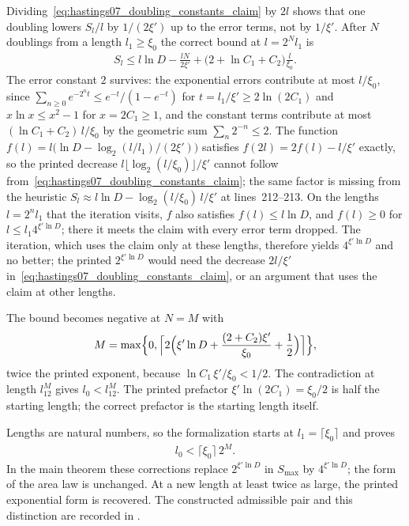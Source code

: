 \documentclass{article}
\begin{document}
Dividing~\eqref{eq:hastings07_doubling_constants_claim} by $2l$ shows that one
doubling lowers $S_l/l$ by
$1/(2\xi')$ up to the error terms, not by $1/\xi'$. After $N$ doublings
from a length $l_1\ge\xi_0$ the correct bound at $l=2^Nl_1$ is
\begin{align}
    S_l\le l\ln D-\frac{lN}{2\xi'}+\bigl(2+\ln C_1+C_2\bigr)\frac{l}{\xi_0}.
    \label{eq:hastings07_doubling_constants_corrected_bound}
\end{align}
The error constant $2$ survives: the exponential errors contribute at most
$l/\xi_0$, since $\sum_{n\ge0}e^{-2^nt}\le e^{-t}/(1-e^{-t})$ for
$t=l_1/\xi'\ge2\ln(2C_1)$ and $x\ln x\le x^2-1$ for $x=2C_1\ge1$, and the
constant terms contribute at most $(\ln C_1+C_2)\,l/\xi_0$ by the geometric
sum $\sum_n2^{-n}\le2$. The function
$f(l)=l\bigl(\ln D-\log_2(l/l_1)/(2\xi')\bigr)$ satisfies
$f(2l)=2f(l)-l/\xi'$ exactly, so the printed decrease
$l\lfloor\log_2(l/\xi_0)\rfloor/\xi'$ cannot follow
from~\eqref{eq:hastings07_doubling_constants_claim}; the same factor is missing
from the heuristic
$S_l\approx l\ln D-\log_2(l/\xi_0)\,l/\xi'$ at lines~212--213.
On the lengths $l=2^nl_1$ that the iteration visits, $f$ also satisfies
$f(l)\le l\ln D$, and $f(l)\ge0$ for $l\le l_1 4^{\xi'\ln D}$; there it
meets the claim with every error term dropped. The iteration, which uses the
claim only at these lengths, therefore yields $4^{\xi'\ln D}$ and no better;
the printed $2^{\xi'\ln D}$ would need the decrease $2l/\xi'$
in~\eqref{eq:hastings07_doubling_constants_claim}, or an argument that uses the
claim at other lengths.

The bound becomes negative at $N=M$ with
\begin{align}
    M=\max\Bigl\{0,\Bigl\lceil2\Bigl(\xi'\ln D+\frac{(2+C_2)\xi'}{\xi_0}
    +\frac12\Bigr)\Bigr\rceil\Bigr\},
    \label{eq:hastings07_doubling_constants_exponent}
\end{align}
twice the printed exponent, because $\ln C_1\,\xi'/\xi_0<1/2$. The
contradiction at length $l_12^M$ gives $l_0<l_12^M$. The printed prefactor
$\xi'\ln(2C_1)=\xi_0/2$ is half the starting length; the correct prefactor
is the starting length itself.

Lengths are natural numbers, so the formalization starts at
$l_1=\lceil\xi_0\rceil$ and proves
\begin{align}
    l_0<\lceil\xi_0\rceil\,2^M .
    \label{eq:hastings07_doubling_constants_corrected_window}
\end{align}
In the main theorem these corrections replace $2^{\xi'\ln D}$ in $S_{\max}$
by $4^{\xi'\ln D}$; the form of the area law is unchanged. At a new length at least twice as large, the printed exponential form is
recovered. The constructed admissible pair and this distinction are recorded in
.
\end{document}
